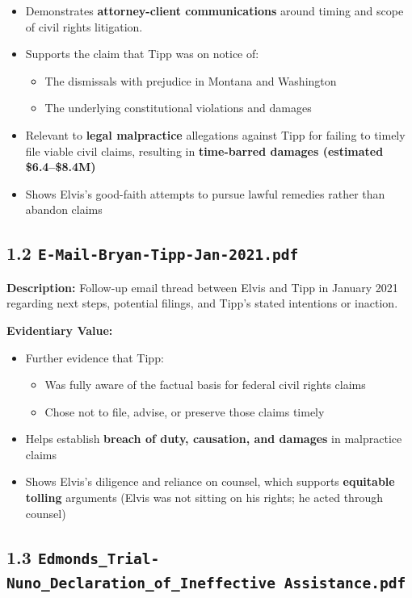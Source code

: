 \documentclass[11pt, letterpaper]{article}
\begin{document}
\begin{itemize}[leftmargin=*]
  \item Demonstrates \textbf{attorney-client communications} around timing and scope of civil rights litigation.
  \item Supports the claim that Tipp was on notice of:
    \begin{itemize}
      \item The dismissals with prejudice in Montana and Washington
      \item The underlying constitutional violations and damages
    \end{itemize}
  \item Relevant to \textbf{legal malpractice} allegations against Tipp for failing to timely file viable civil claims, resulting in \textbf{time-barred damages (estimated \$6.4--\$8.4M)}
  \item Shows Elvis's good-faith attempts to pursue lawful remedies rather than abandon claims
\end{itemize}

\subsection{1.2 \texttt{E-Mail-Bryan-Tipp-Jan-2021.pdf}}

\textbf{Description:} Follow-up email thread between Elvis and Tipp in January 2021 regarding next steps, potential filings, and Tipp's stated intentions or inaction.

\textbf{Evidentiary Value:}

\begin{itemize}[leftmargin=*]
  \item Further evidence that Tipp:
    \begin{itemize}
      \item Was fully aware of the factual basis for federal civil rights claims
      \item Chose not to file, advise, or preserve those claims timely
    \end{itemize}
  \item Helps establish \textbf{breach of duty, causation, and damages} in malpractice claims
  \item Shows Elvis's diligence and reliance on counsel, which supports \textbf{equitable tolling} arguments (Elvis was not sitting on his rights; he acted through counsel)
\end{itemize}

\subsection{1.3 \texttt{Edmonds\_Trial-Nuno\_Declaration\_of\_Ineffective Assistance.pdf}}
\end{document}
